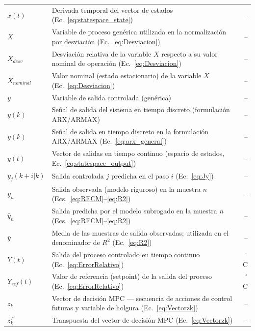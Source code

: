 \begin{longtable}{@{} l p{} r @{}}
$\dot{x}(t)$
  & Derivada temporal del vector de estados (Ec.~\ref{eq:statespace_state})
  & -- \\

$X$
  & Variable de proceso genérica utilizada en la normalización por desviación (Ec.~\ref{eq:Desviacion})
  & -- \\

$X_{desv}$
  & Desviación relativa de la variable $X$ respecto a su valor nominal de operación (Ec.~\ref{eq:Desviacion})
  & -- \\

$X_{nominal}$
  & Valor nominal (estado estacionario) de la variable $X$ (Ec.~\ref{eq:Desviacion})
  & -- \\

$y$
  & Variable de salida controlada (genérica)
  & -- \\

$y(k)$
  & Señal de salida del sistema en tiempo discreto (formulación ARX/ARMAX)
  & -- \\

$\bar{y}(k)$
  & Señal de salida en tiempo discreto en la formulación ARX/ARMAX (Ec.~\ref{eq:arx_general})
  & -- \\

$y(t)$
  & Vector de salidas en tiempo continuo (espacio de estados, Ec.~\ref{eq:statespace_output})
  & -- \\

$y_j(k{+}i|k)$
  & Salida controlada $j$ predicha en el paso $i$ (Ec.~\ref{eq:Jy})
  & -- \\

$y_n$
  & Salida observada (modelo riguroso) en la muestra $n$ (Ecs.~\ref{eq:RECM}--\ref{eq:R2})
  & -- \\

$\hat{y}_n$
  & Salida predicha por el modelo subrogado en la muestra $n$ (Ecs.~\ref{eq:RECM}--\ref{eq:R2})
  & -- \\

$\bar{y}$
  & Media de las muestras de salida observadas; utilizada en el denominador de $R^2$ (Ec.~\ref{eq:R2})
  & -- \\

$Y(t)$
  & Salida del proceso controlado en tiempo continuo (Ec.~\ref{eq:ErrorRelativo})
  & $^{\circ}$C \\

$Y_{ref}(t)$
  & Valor de referencia (setpoint) de la salida del proceso (Ec.~\ref{eq:ErrorRelativo})
  & $^{\circ}$C \\

$z_k$
  & Vector de decisión MPC — secuencia de acciones de control futuras y variable de holgura (Ec.~\ref{eq:Vectorzk})
  & -- \\

$z_k^T$
  & Transpuesta del vector de decisión MPC (Ec.~\ref{eq:Vectorzk})
  & -- \\

\bottomrule
\end{longtable}

